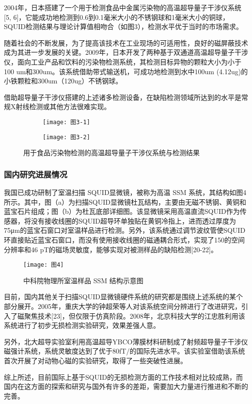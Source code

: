 \documentclass[a4paper,12pt，twoside]{ctexart}
\begin{document}
	2004年，日本搭建了一个用于检测食品中金属污染物的高温超导量子干涉仪系统[5, 6]，它能成功地检测到0.6到0.1毫米大小的不锈钢球和1毫米大小的铜球，SQUID检测结果与理论计算值相吻合（如图3），检测水平优于当时的市场需求。\par
	随着社会的不断发展，为了提高该技术在工业现场的可适用性，良好的磁屏蔽技术成为其进一步发展的关键。2009年，日本开发了两种基于双通道高温超导量子干涉仪，面向工业产品和饮料的污染物检测系统，其检测目标异物的颗粒大小为小于100 um和300um。该系统借助带式输送机，可成功地检测到水中100um (4.12ug)的小铁颗粒和300um（120ug）不锈钢球。\par
	借助超导量子干涉仪搭建的上述诸多检测设备，在缺陷检测领域所达到的水平是常规X射线检测或其他方法很难实现。\par
	\begin{figure}[htbp]
		\centering
		\begin{subfigure}[b]{0.45\textwidth}
			\texttt{[image: 图3-1]}
		\end{subfigure}
		\hfill
		\begin{subfigure}[b]{0.45\textwidth}
			\texttt{[image: 图3-2]}
		\end{subfigure}
		\caption{用于食品污染物检测的高温超导量子干涉仪系统与检测结果}\label{图3}
	\end{figure}
	
	\subsubsection{国内研究进展情况}
	我国已成功研制了室温扫描 SQUID显微镜，被称为高温 SSM 系统，其结构如图4所示。其中，图（a）为扫描SQUID显微镜杜瓦结构，主要由无磁不锈钢、黄铜和蓝宝石片组成；图（b）为杜瓦底部详细图。该显微镜采用高温直流SQUID作为传感器，将没有接收线圈的SQUID超导环单独贴在黄铜冷指上，进而透过厚度为75μm的蓝宝石窗口对室温样品进行检测。另外，该系统通过调节波纹管使SQUID环直接贴近蓝宝石窗口，而没有使用接收线圈的磁通耦合形式，实现了150的空间分辨率和46 pT的磁场灵敏度，能够实现对被测样品的缺陷检测[20-22]。\par
	\begin{figure}[htbp]
		\centering
		\texttt{[image: 图4]}
		\caption{中科院物理所室温样品 SSM 结构示意图}\label{图4}
	\end{figure}
	目前，国内其他关于扫描SQUID显微镜硬件系统的研究都是围绕上述系统的某个部分展开。2005年，重庆大学的钟超荣等人对该系统空间分辨进行了改进研究，引入了磁聚焦技术[23]，但仅限于仿真阶段。2008年，北京科技大学的江忠胜利用该系统进行了初步无损检测实验研究，效果差强人意。\par
	另外，北大超导实验室利用高温超导YBCO薄膜材料研制成了射频超导量子干涉仪磁强计系统，系统灵敏度达到了优于80fT/的国际先进水平。该实验室借助该系统首次开展了对动物心磁的实验研究，取得了一些突破性进展。\par
	综上所述，目前国际上基于SQUID的无损检测方面的工作技术相对比较成熟，而国内在这方面的探索和研究与国外有许多的差距，需要加大力量进行推进和不断的完善。\par
\end{document}
